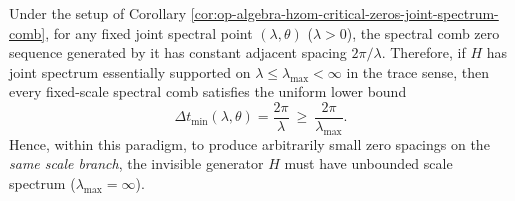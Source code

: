 \begin{corollary}\label{cor:op-algebra-hzom-zero-spacing-scale-lower-bound}
Under the setup of Corollary \ref{cor:op-algebra-hzom-critical-zeros-joint-spectrum-comb},
for any fixed joint spectral point \((\lambda,\theta)\) (\(\lambda>0\)), the spectral comb zero sequence generated by it has constant adjacent spacing \(2\pi/\lambda\).
Therefore, if \(H\) has joint spectrum essentially supported on \(\lambda\le \lambda_{\max}<\infty\) in the trace sense, then every fixed-scale spectral comb satisfies the uniform lower bound
\[
\boxed{\ \Delta t_{\min}(\lambda,\theta)=\frac{2\pi}{\lambda}\ \ge\ \frac{2\pi}{\lambda_{\max}}.\ }
\]
Hence, within this paradigm, to produce arbitrarily small zero spacings on the \emph{same scale branch}, the invisible generator \(H\) must have unbounded scale spectrum (\(\lambda_{\max}=\infty\)).
\end{corollary}

